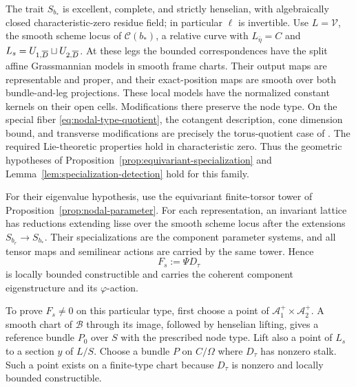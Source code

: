 The trait $S_{b_*}$ is excellent, complete, and strictly henselian,
with algebraically closed characteristic-zero residue field; in
particular $\ell$ is invertible.  Use $L=\mathcal V$, the smooth
scheme locus of $\mathcal C(b_*)$, a relative curve with
$L_{\bar\eta}=C$ and $L_s=U_{1,\overline D}\sqcup U_{2,\overline D}$.
At these legs the bounded correspondences have the split affine
Grassmannian models in smooth frame charts.  Their output maps are
representable and proper, and their exact-position maps are smooth
over both bundle-and-leg projections.  These local models have the
normalized constant kernels on their open cells.  Modifications
there preserve the node type.  On the special fiber
\eqref{eq:nodal-type-quotient}, the cotangent description, cone
dimension bound, and transverse modifications are precisely the
torus-quotient case of \cite[Section~3 and Section~8.2]{CT}.
The required Lie-theoretic properties hold in characteristic zero.
Thus the geometric hypotheses of
Proposition~\ref{prop:equivariant-specialization} and
Lemma~\ref{lem:specialization-detection} hold for this family.

For their eigenvalue hypothesis, use the equivariant finite-torsor
tower of Proposition~\ref{prop:nodal-parameter}.  For each
representation, an invariant lattice has reductions extending
lisse over the smooth scheme locus after the extensions
$S_{b_r}\to S_{b_*}$.  Their specializations are the component
parameter systems, and all tensor maps and semilinear actions are
carried by the same tower.  Hence
\begin{equation}\label{eq:nodal-nearby}
 F_s:=\Psi D_\tau
\end{equation}
is locally bounded constructible and carries the coherent component
eigenstructure and its $\varphi$-action.

To prove $F_s\ne0$ on this particular type, first choose a point of
$\mathcal A_1^+\times\mathcal A_2^+$.  A smooth chart of
$\mathcal B$ through its image, followed by henselian lifting,
gives a reference bundle $P_0$ over $S$ with the prescribed node
type.  Lift also a point of $L_s$ to a section $y$ of $L/S$.
Choose a bundle $P$ on $C/\Omega$ where $D_\tau$ has nonzero stalk.
Such a point exists on a finite-type chart because $D_\tau$ is
nonzero and locally bounded constructible.

